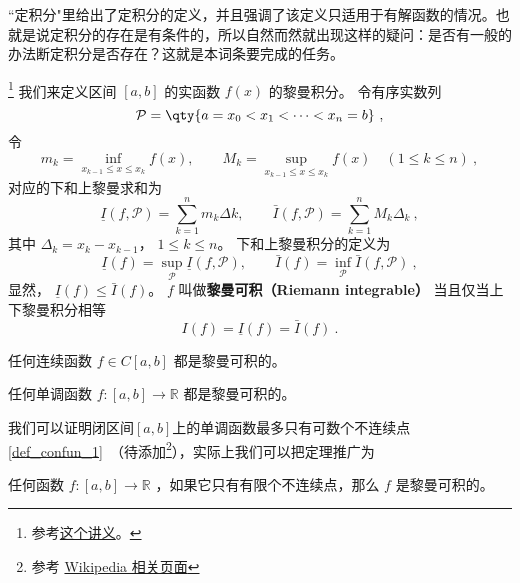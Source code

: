 
“定积分"里给出了定积分的定义，并且强调了该定义只适用于有解函数的情况。也就是说定积分的存在是有条件的，所以自然而然就出现这样的疑问：是否有一般的办法断定积分是否存在？这就是本词条要完成的任务。

\footnote{参考\href{https://math.berkeley.edu/~arveson/Dvi/105/note1.pdf}{这个讲义}。}
我们来定义区间 $[a, b]$ 的实函数 $f(x)$ 的黎曼积分。 令有序实数列
\begin{equation}
\mathcal P = \qty{a = x_0 < x_1 < \dots < x_n = b}~,
\end{equation}
令
\begin{equation}
m_k = \inf_{x_{k-1} \le x \le x_k} f(x), \qquad M_k = \sup_{x_{k-1} \le x \le x_k} f(x) \quad (1 \le k \le n)~,
\end{equation}
对应的下和上黎曼求和为
\begin{equation}
\underline I(f, \mathcal P) = \sum_{k = 1}^n m_k\Delta k, \qquad \bar I(f, \mathcal P) = \sum_{k = 1}^n M_k \Delta_k~,
\end{equation}
其中 $\Delta_k = x_k - x_{k-1}$， $1\le k\le n$。 下和上黎曼积分的定义为
\begin{equation}
\underline I(f) = \sup_{\mathcal P} \underline I(f, \mathcal P), \qquad \bar I(f) = \inf_{\mathcal P} \bar I(f, \mathcal P)~,
\end{equation}
显然， $\underline I(f) \le \bar I(f)$。 $f$ 叫做\textbf{黎曼可积（Riemann integrable）} 当且仅当上下黎曼积分相等
\begin{equation}
I(f) = \underline I(f) = \bar I(f)~.
\end{equation}

\begin{theorem}{}
任何连续函数 $f \in C[a, b]$ 都是黎曼可积的。
\end{theorem}

\begin{theorem}{}
任何单调函数 $f: [a, b] \to \mathbb{R}$ 都是黎曼可积的。
\end{theorem}

我们可以证明闭区间$[a, b]$上的单调函数最多只有可数个不连续点\autoref{def_confun_1}~（待添加\footnote{参考 \href{https://en.wikipedia.org/wiki/Discontinuities_of_monotone_functions}{Wikipedia 相关页面}}），实际上我们可以把定理推广为

\begin{theorem}{}
任何函数 $f: [a, b] \to \mathbb{R}$ ，如果它只有有限个不连续点，那么 $f$ 是黎曼可积的。
\end{theorem}

